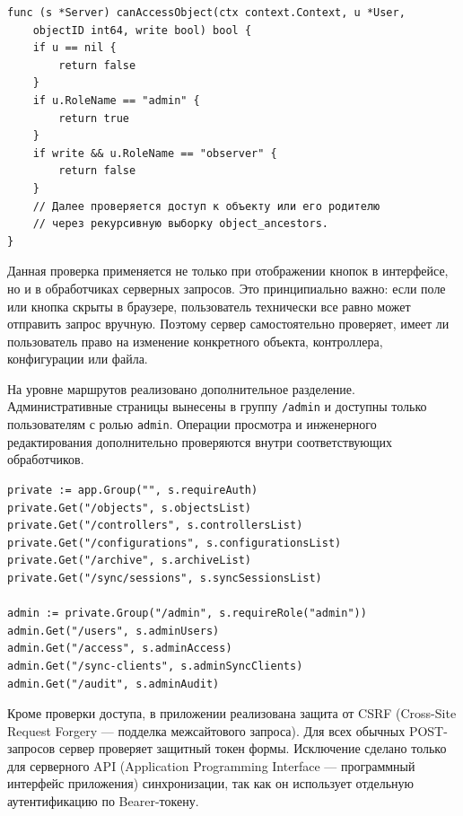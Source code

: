 \begin{samepage}
\begin{lstlisting}[caption={Проверка доступа к объекту с учетом уровня доступа}, label={lst:chapter3_access_check}]
func (s *Server) canAccessObject(ctx context.Context, u *User,
    objectID int64, write bool) bool {
    if u == nil {
        return false
    }
    if u.RoleName == "admin" {
        return true
    }
    if write && u.RoleName == "observer" {
        return false
    }
    // Далее проверяется доступ к объекту или его родителю
    // через рекурсивную выборку object_ancestors.
}
\end{lstlisting}
\end{samepage}

Данная проверка применяется не только при отображении кнопок в интерфейсе, но и в обработчиках серверных запросов. Это принципиально важно: если поле или кнопка скрыты в браузере, пользователь технически все равно может отправить запрос вручную. Поэтому сервер самостоятельно проверяет, имеет ли пользователь право на изменение конкретного объекта, контроллера, конфигурации или файла.

На уровне маршрутов реализовано дополнительное разделение. Административные страницы вынесены в группу \texttt{/admin} и доступны только пользователям с ролью \texttt{admin}. Операции просмотра и инженерного редактирования дополнительно проверяются внутри соответствующих обработчиков.

\begin{samepage}
\begin{lstlisting}[caption={Регистрация основных маршрутов приложения}, label={lst:chapter3_routes}]
private := app.Group("", s.requireAuth)
private.Get("/objects", s.objectsList)
private.Get("/controllers", s.controllersList)
private.Get("/configurations", s.configurationsList)
private.Get("/archive", s.archiveList)
private.Get("/sync/sessions", s.syncSessionsList)

admin := private.Group("/admin", s.requireRole("admin"))
admin.Get("/users", s.adminUsers)
admin.Get("/access", s.adminAccess)
admin.Get("/sync-clients", s.adminSyncClients)
admin.Get("/audit", s.adminAudit)
\end{lstlisting}
\end{samepage}

Кроме проверки доступа, в приложении реализована защита от CSRF (Cross-Site Request Forgery --- подделка межсайтового запроса). Для всех обычных POST-запросов сервер проверяет защитный токен формы. Исключение сделано только для серверного API (Application Programming Interface --- программный интерфейс приложения) синхронизации, так как он использует отдельную аутентификацию по Bearer-токену.

